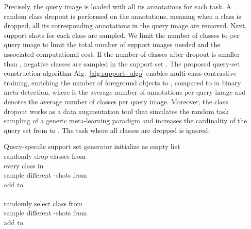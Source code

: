 \documentclass[10pt,twocolumn,letterpaper]{article}
\makeatletter
\newcommand{\algorithmfootnote}[2][\footnotesize]{\let\old@algocf@finish\@algocf@finish \def\@algocf@finish{\old@algocf@finish \leavevmode\rlap{\begin{minipage}{\linewidth}
    #1#2
    \end{minipage}}}}
\makeatother
\begin{document}
Precisely, the query image is loaded with all its annotations for each task. A random class dropout is performed on the annotations, meaning when a class is dropped, all its corresponding annotations in the query image are removed. Next,  support shots for each class are sampled. We limit the number of classes to  per query image to limit the total number of support images needed and the associated computational cost. If the number of classes after dropout is smaller than , negative classes are sampled in the support set . The proposed query-set construction algorithm Alg.~\ref{alg:support_algo} enables multi-class contrastive training, enriching the number of foreground objects to , compared to  in binary meta-detection, where  is the average number of annotations per query image and  denotes the average number of classes per query image. Moreover, the class dropout works as a data augmentation tool that simulates the random task sampling of a generic meta-learning paradigm and increases the cardinality of the query set from  to . The task where all classes are dropped is ignored.    

\setlength{\textfloatsep}{15pt}\begin{algorithm}[t!]
    \algorithmfootnote{ denotes the initial value.}
	\begin{algo}{Query-specific support set  generator}
		{
			\small 
			\label{alg:support_algo}
		}   initialize  as empty list\\
		randomly drop classes from \\ 
		\qfor every class  in  \\
		sample different -shots from  \\ 
		add  to \qrof\\
		
		\qwhile  \\
		randomly select class  from \label{algo_line:removal}\\
		sample different -shots from \\
		add to \qelihw\\
		\qreturn 
	\end{algo}
	\caption[Multi-way support set ]{Multi-way support set generation algorithm.}
    
\end{algorithm}
\vspace{-1em}
 
\end{document}
